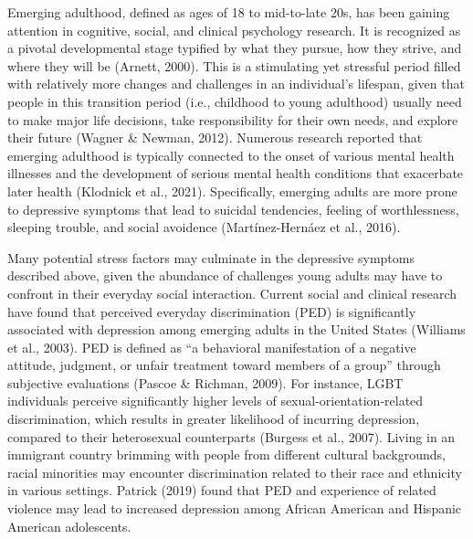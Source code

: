 \documentclass[
  man]{apa7}
\begin{document}
Emerging adulthood, defined as ages of 18 to mid-to-late 20s, has been gaining attention in cognitive, social, and clinical psychology research. It is recognized as a pivotal developmental stage typified by what they pursue, how they strive, and where they will be (Arnett, 2000). This is a stimulating yet stressful period filled with relatively more changes and challenges in an individual's lifespan, given that people in this transition period (i.e., childhood to young adulthood) usually need to make major life decisions, take responsibility for their own needs, and explore their future (Wagner \& Newman, 2012). Numerous research reported that emerging adulthood is typically connected to the onset of various mental health illnesses and the development of serious mental health conditions that exacerbate later health (Klodnick et al., 2021). Specifically, emerging adults are more prone to depressive symptoms that lead to suicidal tendencies, feeling of worthlessness, sleeping trouble, and social avoidence (Martínez-Hernáez et al., 2016).

Many potential stress factors may culminate in the depressive symptoms described above, given the abundance of challenges young adults may have to confront in their everyday social interaction. Current social and clinical research have found that perceived everyday discrimination (PED) is significantly associated with depression among emerging adults in the United States (Williams et al., 2003). PED is defined as ``a behavioral manifestation of a negative attitude, judgment, or unfair treatment toward members of a group'' through subjective evaluations (Pascoe \& Richman, 2009). For instance, LGBT individuals perceive significantly higher levels of sexual-orientation-related discrimination, which results in greater likelihood of incurring depression, compared to their heterosexual counterparts (Burgess et al., 2007). Living in an immigrant country brimming with people from different cultural backgrounds, racial minorities may encounter discrimination related to their race and ethnicity in various settings. Patrick (2019) found that PED and experience of related violence may lead to increased depression among African American and Hispanic American adolescents.
\end{document}
